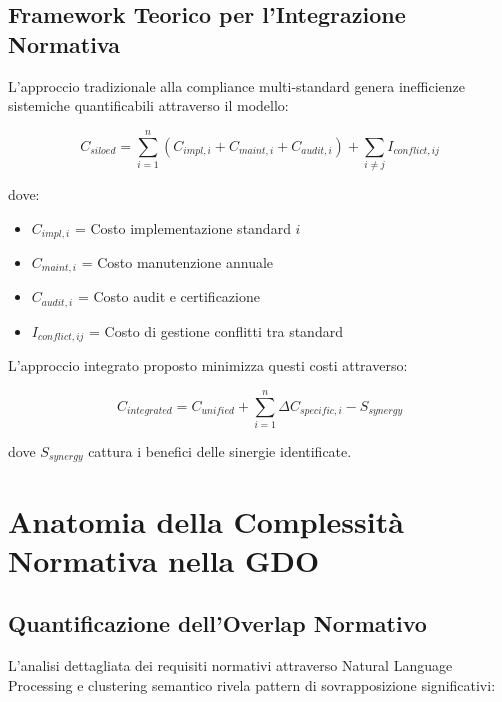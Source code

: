 \subsection{Framework Teorico per l'Integrazione Normativa}

L'approccio tradizionale alla compliance multi-standard genera inefficienze sistemiche quantificabili attraverso il modello:

\begin{equation}
C_{siloed} = \sum_{i=1}^{n} (C_{impl,i} + C_{maint,i} + C_{audit,i}) + \sum_{i \neq j} I_{conflict,ij}
\end{equation}

dove:
\begin{itemize}
\item $C_{impl,i}$ = Costo implementazione standard $i$
\item $C_{maint,i}$ = Costo manutenzione annuale
\item $C_{audit,i}$ = Costo audit e certificazione
\item $I_{conflict,ij}$ = Costo di gestione conflitti tra standard
\end{itemize}

L'approccio integrato proposto minimizza questi costi attraverso:

\begin{equation}
C_{integrated} = C_{unified} + \sum_{i=1}^{n} \Delta C_{specific,i} - S_{synergy}
\end{equation}

dove $S_{synergy}$ cattura i benefici delle sinergie identificate.

\section{Anatomia della Complessità Normativa nella GDO}

\subsection{Quantificazione dell'Overlap Normativo}

L'analisi dettagliata dei requisiti normativi attraverso Natural Language Processing e clustering semantico rivela pattern di sovrapposizione significativi:

